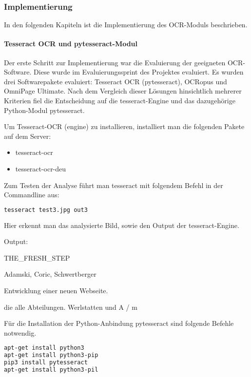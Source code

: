 \subsubsection{Implementierung}
In den folgenden Kapiteln ist die Implementierung des OCR-Moduls beschrieben.
\paragraph{Tesseract OCR und pytesseract-Modul}
Der erste Schritt zur Implementierung war die Evaluierung der geeigneten OCR-Software. Diese wurde im Evaluierungssprint des Projektes evaluiert. Es wurden drei Softwarepakete evaluiert: Tesseract OCR (pytesseract), OCRopus und OmniPage Ultimate. Nach dem Vergleich dieser Lösungen hinsichtlich mehrerer Kriterien fiel die Entscheidung auf die tesseract-Engine und das dazugehörige Python-Modul pytesseract.

Um Tesseract-OCR (engine) zu installieren, installiert man die folgenden Pakete auf dem Server:
\begin{itemize}
\item tesseract-ocr
\item tesseract-ocr-deu
\end{itemize}

\newpage

Zum Testen der Analyse führt man tesseract mit folgendem Befehl in der Commandline aus:
\begin{lstlisting}[caption={tesseract-Ausführung}, language=bash]
tesseract test3.jpg out3
\end{lstlisting}
\cite{TESS1} \cite{TESS2}

Hier erkennt man das analysierte Bild, sowie den Output der tesseract-Engine.


Output:

THE\_FRESH\_STEP

Adamski, Coric, Schwertberger

Entwicklung einer neuen Webseite.

die alle Abteilungen. Werlstatten und A / m

Für die Installation der Python-Anbindung pytesseract sind folgende Befehle notwendig.

\begin{lstlisting}[caption={pytesseract-Installation}, language=bash]
apt-get install python3
apt-get install python3-pip
pip3 install pytesseract
apt-get install python3-pil
\end{lstlisting}
\cite{PYTES} \cite{PYTES2} \cite{PYTES3}

